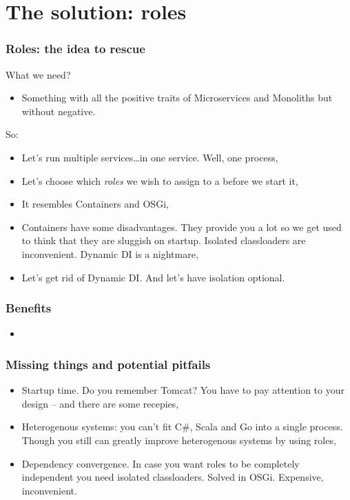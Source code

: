 \documentclass[usenames,dvipsnames]{beamer}
\begin{document}
\section{The solution: roles}

\begin{frame}
\frametitle{Roles: the idea to rescue}
What we need?
\begin{itemize}
\item Something with all the positive traits of Microservices and Monoliths but without negative.
\end{itemize}
\vspace{0.3cm}
So:
\begin{itemize}
\item Let's run multiple services\dots in one service. Well, one process,
\item Let's choose which \textit{roles} we wish to assign to a  before we start it,
\item It resembles Containers and OSGi,
\item Containers have some disadvantages. 
      They provide you a lot so we get used to think that they are sluggish on startup.
      Isolated classloaders are inconvenient. Dynamic DI is a nightmare,
\item Let's get rid of Dynamic DI. And let's have isolation optional.
\end{itemize}
\end{frame}

\begin{frame}
\frametitle{Benefits}
\begin{itemize}
\item 
\end{itemize}
\end{frame}

\begin{frame}
\frametitle{Missing things and potential pitfails}
\begin{itemize}
\item Startup time. Do you remember Tomcat? You have to pay attention to your design -- and there are some recepies\footnotemark[1],
\item Heterogenous systems: you can't fit C\#, Scala and Go into a single process. 
      Though you still can greatly improve heterogenous systems by using roles,
\item Dependency convergence. In case you want roles to be completely independent you need
      isolated classloaders. Solved in OSGi. Expensive, inconvenient.
\end{itemize}
\end{frame}
\end{document}
